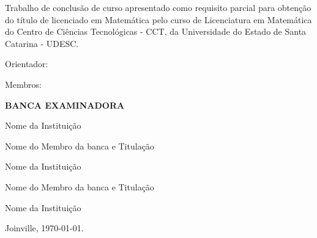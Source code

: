 \documentclass[../main.tex]{subfiles}
\begin{document}

%
% 


\begin{folhadeaprovacao}

  \begin{center}
    \textbf{\authorName}
\vspace {1 cm}

   \titleComplete 
   \vspace {1 cm}
  \end{center}
    
\begin{flushright}
  \begin{minipage}[t]{8 cm}
  { Trabalho de conclusão de curso apresentado como requisito parcial para obtenção do título de licenciado em Matemática pelo curso de Licenciatura em Matemática do Centro de Ciências Tecnológicas - CCT, da Universidade do Estado de Santa Catarina - UDESC. 

 Orientador: \orientationBy}
 
  \end{minipage}
  \end{flushright}
     
     \begin{minipage}[c]{3cm} 
	Membros:
\end{minipage}
\begin{minipage}[c]{8 cm}
	\begin{center}
	\textbf{BANCA EXAMINADORA}
	\vspace {2 cm}
	
    \orientationBy
	
    Nome da Instituição
    
    \vspace {1.5 cm}
    
    Nome do Membro da banca e Titulação
	
    Nome da Instituição
    
    \vspace {1.5 cm}
    
    Nome do Membro da banca e Titulação
	
    Nome da Instituição
    \vspace {1.5 cm}
    
    
\end{center}

\end{minipage}

\vspace*{\fill}
     \begin{center}
	     Joinville, \today.
\end{center}

    
\end{folhadeaprovacao}
\end{document}
